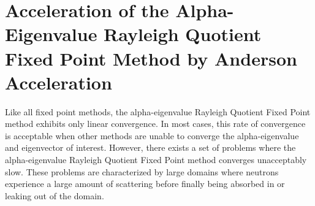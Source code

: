 \chapter{Acceleration of the Alpha-Eigenvalue Rayleigh Quotient Fixed Point Method by Anderson Acceleration}
\label{sec:AndAcc}

Like all fixed point methods, the alpha-eigenvalue Rayleigh Quotient Fixed Point method exhibits only linear convergence. In most cases, this rate of convergence is acceptable when other methods are unable to converge the alpha-eigenvalue and eigenvector of interest. However, there exists a set of problems where the alpha-eigenvalue Rayleigh Quotient Fixed Point method converges unacceptably slow. These problems are characterized by large domains where neutrons experience a large amount of scattering before finally being absorbed in or leaking out of the domain.